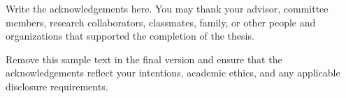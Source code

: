 Write the acknowledgements here. You may thank your advisor, committee members, research collaborators, classmates, family, or other people and organizations that supported the completion of the thesis.

Remove this sample text in the final version and ensure that the acknowledgements reflect your intentions, academic ethics, and any applicable disclosure requirements.
